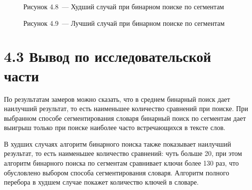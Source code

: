 \documentclass[12pt, a4paper]{report}
\begin{document}
	\begin{figure}[H]
		\caption*{Рисунок 4.8~--- Худший случай при бинарном поиске по сегментам}
	\end{figure}
	
	\begin{figure}[H]
		\caption*{Рисунок 4.9~--- Лучший случай при бинарном поиске по сегментам}
	\end{figure}
	
	\section*{4.3 Вывод по исследовательской части}
	
	По результатам замеров можно сказать, что в среднем бинарный поиск дает наилучший результат, то есть наименьшее количество сравнений при поиске. При выбранном способе сегментирования словаря бинарный поиск по сегментам дает выигрыш только при поиске наиболее часто встречающихся в тексте слов.
	
	В худших случаях алгоритм бинарного поиска также показывает наилучший результат, то есть наименьшее количество сравнений: чуть больше 20, при этом алгоритм бинарного поиска по сегментам сравнивает ключи более 130 раз, что обусловлено выбором способа сегментирования словаря. Алгоритм полного перебора в худшем случае покажет количество ключей в словаре.
	
\end{document}
